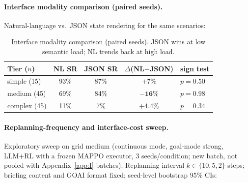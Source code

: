 \documentclass[sigconf,anonymous]{aamas}
\begin{document}
\paragraph{Interface modality comparison (paired seeds).}
Natural-language vs.\ JSON state rendering for the same scenarios:

\begin{table}[H]
\centering
\caption{Interface modality comparison (paired seeds). JSON wins at low semantic load; NL trends back at high load.}
\label{tab:interface}
\small
\begin{tabular}{@{}lcccl@{}}
\toprule
Tier ($n$) & NL SR & JSON SR & $\Delta$(NL$-$JSON) & sign test \\
\midrule
simple (15) & 93\% & 87\% & $+7\%$ & $p = 0.50$ \\
medium (45) & 69\% & 84\% & $\mathbf{-16\%}$ & $p = 0.98$ \\
complex (45) & 11\% & 7\% & $+4.4\%$ & $p = 0.34$ \\
\bottomrule
\end{tabular}
\end{table}

\paragraph{Replanning-frequency and interface-cost sweep.}
Exploratory sweep on grid medium (continuous mode, goal-mode strong, LLM+RL with a frozen MAPPO executor, 3 seeds/condition; new batch, not pooled with Appendix~\ref{app:I} batches). Replanning interval $k\in\{10,5,2\}$ steps; briefing content and GOAI format fixed; seed-level bootstrap 95\% CIs:

\begin{table}[H]
\centering
\caption{Replanning-frequency sweep on grid medium (3 seeds/condition, goal-mode strong). Utility rises $10\!\to\!5$ and flattens $5\!\to\!2$ while interface cost grows $\approx$2.5$\times$; every frequency trails the pure-RL baseline. Descriptive plateau candidate, not confirmatory saturation (ceiling effects; small $n$).}
\label{tab:frequency}
\end{table}
\end{document}
